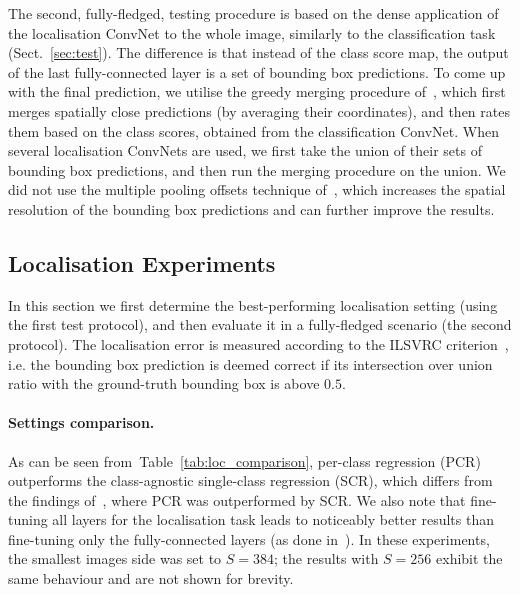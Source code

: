 \documentclass{article} %
\makeatletter
\newcommand{\tblref}[1]{Table~\ref{#1}}
\newcommand{\sref}[1]{Sect.~\ref{#1}}
\newcommand*{\ie}{i.e.\@\xspace}
\makeatother
\begin{document}
The second, fully-fledged, testing procedure is based on the dense application of the localisation ConvNet to the whole image, similarly to the classification task (\sref{sec:test}).
The difference is that instead of the class score map, the output of the last fully-connected layer is a set of bounding box predictions.
To come up with the final prediction, we utilise the greedy merging procedure of~\citet{Sermanet14}, which first merges spatially close predictions (by averaging their coordinates), and then rates them
based on the class scores, obtained from the classification ConvNet. 
When several localisation ConvNets are used, we first take the union of their sets of bounding box predictions, and then run the merging procedure on the union.
We did not use the multiple pooling offsets technique of~\citet{Sermanet14}, which increases the spatial resolution of the bounding box predictions 
and can further improve the results.

\subsection{Localisation Experiments}
\label{sec:loc_eval}

In this section we first determine the best-performing localisation setting (using the first test protocol),
and then evaluate it in a fully-fledged scenario (the second protocol).
The localisation error is measured according to the ILSVRC criterion~\citep{Russakovsky14}, \ie the bounding box prediction is deemed correct if its intersection over union ratio with the ground-truth
bounding box is above $0.5$.

\paragraph{Settings comparison.}
As can be seen from~\tblref{tab:loc_comparison}, per-class regression (PCR) outperforms the class-agnostic single-class regression (SCR), which differs from the findings of~\citet{Sermanet14},
where PCR was outperformed by SCR. We also note that fine-tuning all layers for the localisation task leads to noticeably better results than fine-tuning only the fully-connected layers 
(as done in~\citep{Sermanet14}). In these experiments, the smallest images side was set to $S=384$; the results with $S=256$ exhibit the same behaviour and are not shown for brevity.
\end{document}
